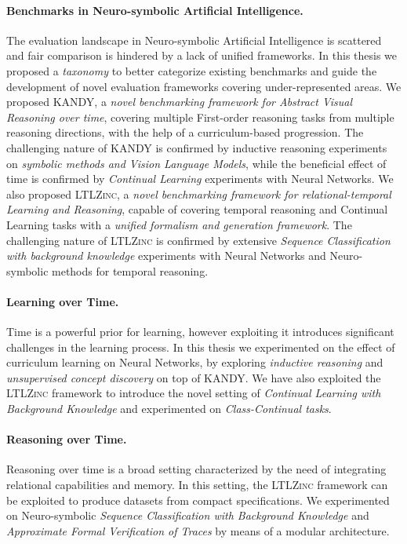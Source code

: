 \paragraph{Benchmarks in Neuro-symbolic Artificial Intelligence.} The evaluation landscape in Neuro-symbolic Artificial Intelligence is scattered and fair comparison is hindered by a lack of unified frameworks. In this thesis we proposed a \textit{taxonomy} to better categorize existing benchmarks and guide the development of novel evaluation frameworks covering under-represented areas. We proposed \textsc{KANDY}, a \textit{novel benchmarking framework for Abstract Visual Reasoning over time}, covering multiple First-order reasoning tasks from multiple reasoning directions, with the help of a curriculum-based progression. The challenging nature of \textsc{KANDY} is confirmed by inductive reasoning experiments on \textit{symbolic methods and Vision Language Models}, while the beneficial effect of time is confirmed by \textit{Continual Learning} experiments with Neural Networks.
We also proposed \textsc{LTLZinc}, a \textit{novel benchmarking framework for relational-temporal Learning and Reasoning}, capable of covering temporal reasoning and Continual Learning tasks with a \textit{unified formalism and generation framework}. The challenging nature of \textsc{LTLZinc} is confirmed by extensive \textit{Sequence Classification with background knowledge} experiments with Neural Networks and Neuro-symbolic methods for temporal reasoning.

\paragraph{Learning over Time.} Time is a powerful prior for learning, however exploiting it introduces significant challenges in the learning process. In this thesis we experimented on the effect of curriculum learning on Neural Networks, by exploring \textit{inductive reasoning} and \textit{unsupervised concept discovery} on top of \textsc{KANDY}. We have also exploited the \textsc{LTLZinc} framework to introduce the novel setting of \textit{Continual Learning with Background Knowledge} and experimented on \textit{Class-Continual tasks}.

\paragraph{Reasoning over Time.} Reasoning over time is a broad setting characterized by the need of integrating relational capabilities and memory. In this setting, the \textsc{LTLZinc} framework can be exploited to produce datasets from compact specifications. We experimented on Neuro-symbolic \textit{Sequence Classification with Background Knowledge} and \textit{Approximate Formal Verification of Traces} by means of a modular architecture.

